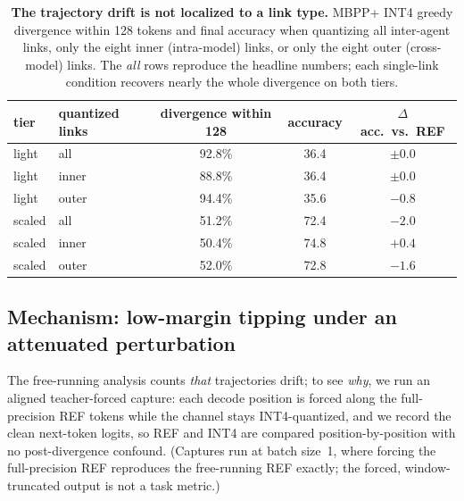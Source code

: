 \documentclass{article}
\begin{document}
\begin{table}[t]
\centering
\caption{\textbf{The trajectory drift is not localized to a link type.} MBPP+ INT4 greedy
divergence within 128 tokens and final accuracy when quantizing all inter-agent links, only the
eight inner (intra-model) links, or only the eight outer (cross-model) links. The \emph{all}
rows reproduce the headline numbers; each single-link condition recovers nearly the whole
divergence on both tiers.}
\label{tab:links}
\begin{tabular}{llccc}
\toprule
tier & quantized links & divergence within 128 & accuracy & $\Delta$ acc.\ vs.\ REF \\
\midrule
light  & all   & 92.8\% & 36.4 & $\pm0.0$ \\
light  & inner & 88.8\% & 36.4 & $\pm0.0$ \\
light  & outer & 94.4\% & 35.6 & $-0.8$ \\
\midrule
scaled & all   & 51.2\% & 72.4 & $-2.0$ \\
scaled & inner & 50.4\% & 74.8 & $+0.4$ \\
scaled & outer & 52.0\% & 72.8 & $-1.6$ \\
\bottomrule
\end{tabular}
\end{table}

\subsection{Mechanism: low-margin tipping under an attenuated perturbation}

The free-running analysis counts \emph{that} trajectories drift; to see \emph{why}, we run an
aligned teacher-forced capture: each decode position is forced along the full-precision REF tokens
while the channel stays INT4-quantized, and we record the clean next-token logits, so REF and INT4
are compared position-by-position with no post-divergence confound. (Captures run at batch
size~1, where forcing the full-precision REF reproduces the free-running REF exactly; the forced,
window-truncated output is not a task metric.)
\end{document}
